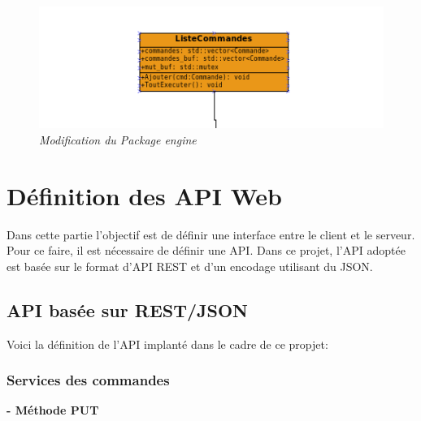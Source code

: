 \documentclass[11pt, a4paper]{article}
\begin{document}
\begin{figure}[H]
  \centering
  \includegraphics[scale=0.45]{img/engine_mod.png}
  \caption{\emph{Modification du Package engine}}
\end{figure}

\section{Définition des API Web}
Dans cette partie l'objectif est de définir une interface entre le client et le serveur. Pour ce faire, il est nécessaire de définir une API.
Dans ce projet, l'API adoptée est basée sur le format d'API REST et d'un encodage utilisant du JSON.
  \subsection{API basée sur REST/JSON}
  Voici la définition de l'API implanté dans le cadre de ce propjet:\\
  \subsubsection{Services des commandes}
  \textbf{- Méthode PUT }
  
\end{document}
